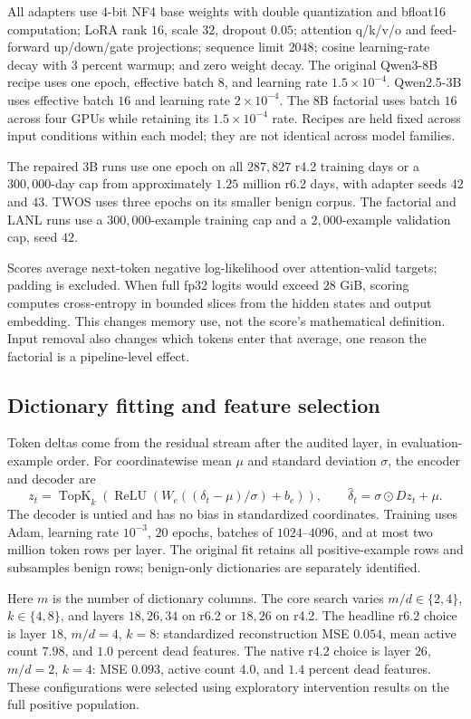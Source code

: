 All adapters use 4-bit NF4 base weights with double quantization and
bfloat16 computation; LoRA rank $16$, scale $32$, dropout $0.05$;
attention q/k/v/o and feed-forward up/down/gate projections;
sequence limit $2048$; cosine learning-rate decay with $3$ percent
warmup; and zero weight decay. The original Qwen3-8B recipe uses one
epoch, effective batch $8$, and learning rate $1.5\times10^{-4}$.
Qwen2.5-3B uses effective batch $16$ and learning rate $2\times10^{-4}$.
The 8B factorial uses batch $16$ across four GPUs while retaining its
$1.5\times10^{-4}$ rate. Recipes are held fixed across input conditions
within each model; they are not identical across model families.

The repaired 3B runs use one epoch on all $287{,}827$ r4.2 training days
or a $300{,}000$-day cap from approximately $1.25$ million r6.2 days,
with adapter seeds $42$ and $43$. TWOS uses three epochs on its smaller
benign corpus. The factorial and LANL runs use a $300{,}000$-example
training cap and a $2{,}000$-example validation cap, seed $42$.

Scores average next-token negative log-likelihood over attention-valid
targets; padding is excluded. When full fp32 logits would exceed
$28$ GiB, scoring computes cross-entropy in bounded slices from the
hidden states and output embedding. This changes memory use, not the
score's mathematical definition. Input removal also changes which tokens
enter that average, one reason the factorial is a pipeline-level effect.

\subsection{Dictionary fitting and feature selection}

Token deltas come from the residual stream after the audited layer,
in evaluation-example order. For coordinatewise mean $\mu$ and standard
deviation $\sigma$, the encoder and decoder are
\[
 z_t=\operatorname{TopK}_k\!\left(\operatorname{ReLU}
 (W_e((\delta_t-\mu)/\sigma)+b_e)\right),\qquad
 \widehat\delta_t=\sigma\odot Dz_t+\mu.
\]
The decoder is untied and has no bias in standardized coordinates.
Training uses Adam, learning rate $10^{-3}$, $20$ epochs, batches of
$1024$--$4096$, and at most two million token rows per layer. The
original fit retains all positive-example rows and subsamples benign
rows; benign-only dictionaries are separately identified.

Here $m$ is the number of dictionary columns. The core search varies
$m/d\in\{2,4\}$, $k\in\{4,8\}$, and layers $18,26,34$ on r6.2
or $18,26$ on r4.2. The headline r6.2 choice is layer $18$, $m/d=4$,
$k=8$: standardized reconstruction MSE $0.054$, mean active count
$7.98$, and $1.0$ percent dead features. The native r4.2 choice is
layer $26$, $m/d=2$, $k=4$: MSE $0.093$, active count $4.0$,
and $1.4$ percent dead features. These configurations were selected
using exploratory intervention results on the full positive population.

